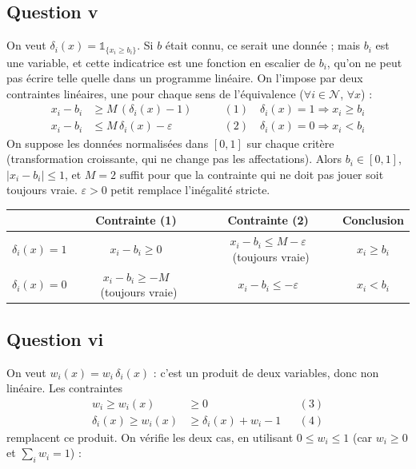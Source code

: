 \documentclass[10pt,a4paper]{article}
\newcommand{\N}{\mathcal{N}}
\begin{document}
\subsection*{Question v}

On veut $\delta_i(x)=\mathds{1}_{\{x_i\geq b_i\}}$. Si $b$ était connu, ce serait une donnée ; mais $b_i$ est une variable,
et cette indicatrice est une fonction en escalier de $b_i$, qu'on ne peut pas écrire telle quelle dans un programme linéaire.
On l'impose par deux contraintes linéaires, une pour chaque sens de l'équivalence ($\forall i\in\N$, $\forall x$) :
\begin{align*}
x_i-b_i &\geq M\,(\delta_i(x)-1) &\qquad (1)\quad \delta_i(x)=1 \Rightarrow x_i\geq b_i \\
x_i-b_i &\leq M\,\delta_i(x)-\varepsilon &\qquad (2)\quad \delta_i(x)=0 \Rightarrow x_i< b_i
\end{align*}
On suppose les données normalisées dans $[0,1]$ sur chaque critère (transformation croissante, qui ne change pas
les affectations). Alors $b_i\in[0,1]$, $|x_i-b_i|\leq 1$, et $M=2$ suffit pour que la contrainte qui ne doit pas jouer
soit toujours vraie. $\varepsilon>0$ petit remplace l'inégalité stricte.

\begin{center}
\begin{tabular}{cccc}
\toprule
 & Contrainte (1) & Contrainte (2) & Conclusion \\
\midrule
$\delta_i(x)=1$ & $x_i-b_i\geq 0$ & $x_i-b_i\leq M-\varepsilon$ \ (toujours vraie) & $x_i\geq b_i$ \\
$\delta_i(x)=0$ & $x_i-b_i\geq -M$ \ (toujours vraie) & $x_i-b_i\leq-\varepsilon$ & $x_i<b_i$ \\
\bottomrule
\end{tabular}
\end{center}

\subsection*{Question vi}

On veut $w_i(x)=w_i\,\delta_i(x)$ : c'est un produit de deux variables, donc non linéaire. Les contraintes
\begin{align*}
w_i \geq w_i(x) &\geq 0 && (3)\\
\delta_i(x) \geq w_i(x) &\geq \delta_i(x)+w_i-1 && (4)
\end{align*}
remplacent ce produit. On vérifie les deux cas, en utilisant $0\leq w_i\leq 1$ (car $w_i\geq 0$ et $\sum_i w_i=1$) :
\end{document}
